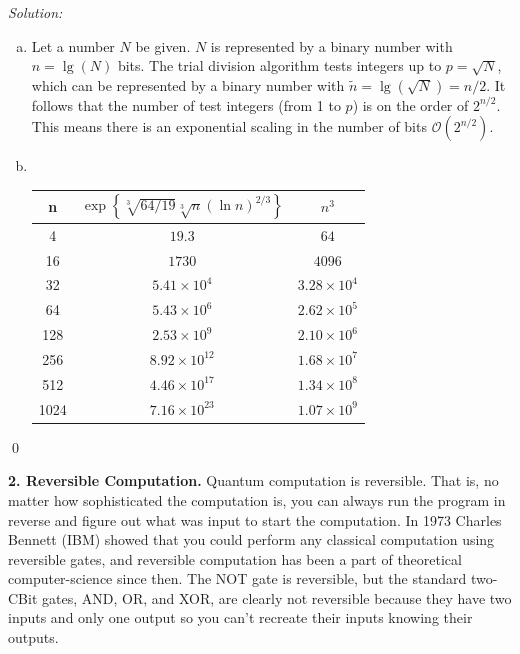 \documentclass{book}
\theoremstyle{definition}
\newcommand{\lp}{\left(}
\newcommand{\rp}{\right)}
\newcommand{\lc}{\left\{}
\newcommand{\rc}{\right\}}
\begin{document}
\noindent \textit{Solution:} 
\begin{enumerate}[(a)]
	\item Let a number $N$ be given. $N$ is represented by a binary number with $n = \lg(N)$ bits. The trial division algorithm tests integers up to $p = \sqrt{N}$, which can be represented by a binary number with $\tilde{n} = \lg(\sqrt{N}) = n/2$. It follows that the number of test integers (from 1 to $p$) is on the order of $2^{n/2}$. This means there is an exponential scaling in the number of bits $\mathcal{O}\lp 2^{n/2} \rp$. 
	\item 
	$\,$\\
	\begin{tabular}{|c|c|c|}
		\hline
		n & $\exp\lc \sqrt[3]{64/19}\sqrt[3]{n}(\ln n)^{2/3}  \rc$ & $n^3$\\
		\hline
		4&$19.3$&$64$\\
		16&$1730$&$4096$\\
		32&$5.41\times 10^4$&$3.28 \times 10^4$\\
		64&$5.43\times 10^6$&$2.62 \times 10^5$\\
		128&$2.53\times 10^9$&$2.10 \times 10^6$\\
		256&$8.92\times 10^{12}$&$1.68 \times 10^7$\\
		512&$4.46\times 10^{17}$&$1.34 \times 10^8$\\
		1024&$7.16\times 10^{23}$&$1.07\times 10^9$\\
		\hline
	\end{tabular}
\end{enumerate}
\qed




\newpage





\noindent \textbf{2. Reversible Computation.} Quantum computation is reversible. That is, no matter how
sophisticated the computation is, you can always run the program in reverse and figure out
what was input to start the computation. In 1973 Charles Bennett (IBM) showed that you
could perform any classical computation using reversible gates, and reversible computation
has been a part of theoretical computer-science since then. The NOT gate is reversible, but
the standard two-CBit gates, AND, OR, and XOR, are clearly not reversible because they
have two inputs and only one output so you can’t recreate their inputs knowing their outputs.
\end{document}
